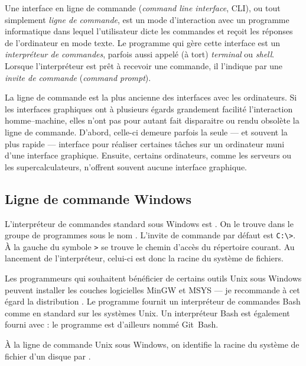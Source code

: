 Une interface en ligne de commande
(\emph{command line interface}, CLI), ou tout simplement \emph{ligne
  de commande}, est un mode d'interaction avec un programme
informatique dans lequel l'utilisateur dicte les commandes et reçoit
les réponses de l'ordinateur en mode texte. Le programme qui gère
cette interface est un \emph{interpréteur de commandes}, parfois aussi
appelé (à tort) \emph{terminal} ou \emph{shell}. Lorsque
l'interpréteur est prêt à recevoir une commande, il l'indique par une
\emph{invite de commande} (\emph{command prompt}).

La ligne de commande est la plus ancienne des interfaces avec les
ordinateurs. Si les interfaces graphiques ont à plusieurs égards
grandement facilité l'interaction homme--machine, elles n'ont pas pour
autant fait disparaitre ou rendu obsolète la ligne de commande.
D'abord, celle-ci demeure parfois la seule --- et souvent la plus
rapide --- interface pour réaliser certaines tâches sur un ordinateur
muni d'une interface graphique. Ensuite, certains ordinateurs, comme
les serveurs ou les supercalculateurs, n'offrent souvent aucune
interface graphique.

\subsection{Ligne de commande Windows}
\label{sec:informatique:cli:windows}

L'interpréteur de commandes standard sous Windows est
. On le trouve dans le groupe
de programmes  sous le nom . L'invite de commande par défaut est \verb=C:\>=. À la
gauche du symbole \verb=>= se trouve le chemin d'accès du répertoire
courant. Au lancement de l'interpréteur, celui-ci est donc la racine
du système de fichiers.

Les programmeurs qui souhaitent bénéficier de certains outils
Unix sous Windows peuvent installer les couches
logicielles MinGW et MSYS --- je recommande à
cet égard la distribution
. Le programme
 fournit un interpréteur de commandes Bash
\citep{bash} comme en standard sur les systèmes Unix. Un interpréteur
Bash est également fourni avec 
: le programme
est d'ailleurs nommé Git~Bash.

À la ligne de commande Unix sous Windows, on identifie la
racine  du système de fichier d'un disque par .

